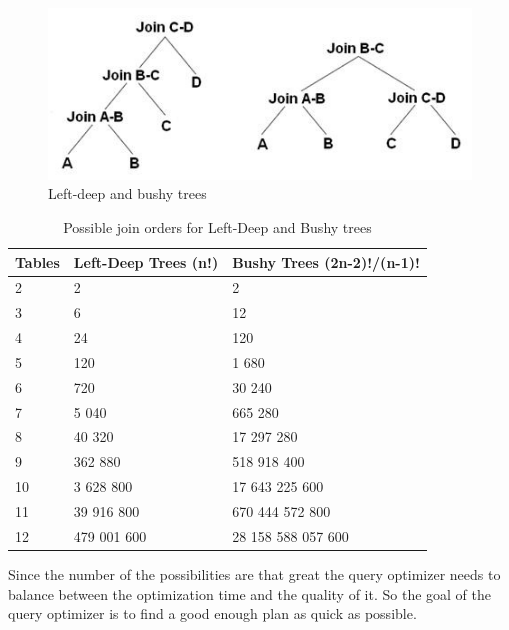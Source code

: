 \documentclass{cslthse-msc}
\begin{document}
\begin{figure}[H] 
\begin{center}
    \includegraphics[scale=0.7]{Pictures/trees.jpg}
  \end{center}
  \caption{Left-deep and bushy trees}
  \label{fig:trees}
\end{figure} 
\begin{table}[H]
\centering 
\begin{tabular}{ l l l }
  Tables & Left-Deep Trees (n!) & Bushy Trees (2n-2)!/(n-1)! \\\hline
  2 & 2 & 2 \\\hline
  3 & 6 & 12 \\\hline
  4 & 24 & 120 \\\hline
  5 & 120 & 1 680 \\\hline
  6 & 720 & 30 240 \\\hline
  7 & 5 040 & 665 280 \\\hline
  8 & 40 320 & 17 297 280 \\\hline
  9 & 362 880 & 518 918 400 \\\hline
  10 & 3 628 800 & 17 643 225 600 \\\hline
  11 & 39 916 800 & 670 444 572 800 \\\hline
  12 & 479 001 600 & 28 158 588 057 600 \\
\end{tabular}
\caption {Possible join orders for Left-Deep and Bushy trees}
\label{table:join}
\end{table}

Since the number of the possibilities are that great the query optimizer needs to balance between the optimization time and the quality of it. So the goal of the query optimizer is to find a good enough plan as quick as possible. 
\end{document}
